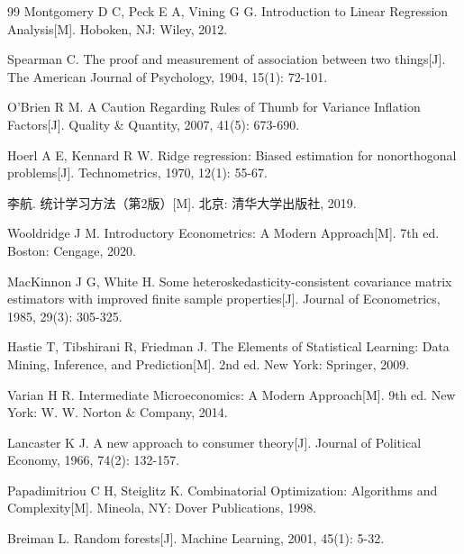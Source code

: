\documentclass[withoutpreface,bwprint]{cumcmthesis} %
\begin{document}
\begin{thebibliography}{99}
Montgomery D C, Peck E A, Vining G G. Introduction to Linear Regression Analysis[M]. Hoboken, NJ: Wiley, 2012.

Spearman C. The proof and measurement of association between two things[J]. The American Journal of Psychology, 1904, 15(1): 72-101.

O'Brien R M. A Caution Regarding Rules of Thumb for Variance Inflation Factors[J]. Quality \& Quantity, 2007, 41(5): 673-690.

Hoerl A E, Kennard R W. Ridge regression: Biased estimation for nonorthogonal problems[J]. Technometrics, 1970, 12(1): 55-67.

李航. 统计学习方法（第2版）[M]. 北京: 清华大学出版社, 2019.

Wooldridge J M. Introductory Econometrics: A Modern Approach[M]. 7th ed. Boston: Cengage, 2020.

MacKinnon J G, White H. Some heteroskedasticity-consistent covariance matrix estimators with improved finite sample properties[J]. Journal of Econometrics, 1985, 29(3): 305-325.

Hastie T, Tibshirani R, Friedman J. The Elements of Statistical Learning: Data Mining, Inference, and Prediction[M]. 2nd ed. New York: Springer, 2009.

Varian H R. Intermediate Microeconomics: A Modern Approach[M]. 9th ed. New York: W. W. Norton \& Company, 2014.

Lancaster K J. A new approach to consumer theory[J]. Journal of Political Economy, 1966, 74(2): 132-157.

Papadimitriou C H, Steiglitz K. Combinatorial Optimization: Algorithms and Complexity[M]. Mineola, NY: Dover Publications, 1998.


Breiman L. Random forests[J]. Machine Learning, 2001, 45(1): 5-32.
\end{thebibliography}
\end{document}
